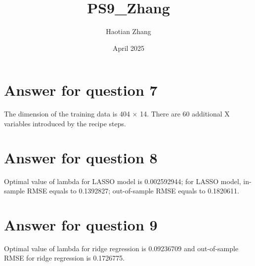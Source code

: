 \documentclass{article}
\title{PS9_Zhang}
\author{Haotian Zhang}
\date{April 2025}
\begin{document}
\maketitle

\section{Answer for question 7}
The dimension of the training data is 404 × 14. There are 60 additional X variables introduced by the recipe steps.

\section{Answer for question 8}

Optimal value of lambda for LASSO model is 0.002592944; for LASSO model, in-sample RMSE equals to 0.1392827; out-of-sample RMSE equals to 0.1820611.

\section{Answer for question 9}

Optimal value of lambda for ridge regression is 0.09236709 and out-of-sample RMSE for ridge regression is 0.1726775.
\end{document}
